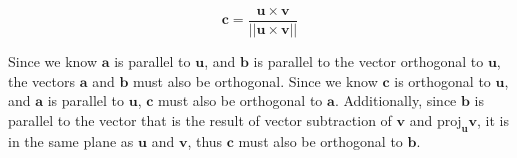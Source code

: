 \documentclass{article}
\newcommand{\mbf}[1]{\mathbf{#1}}
\newcommand{\magn}[1]{||\mbf{#1}||}
\begin{document}
\[
 \mbf{c} = \frac{\mbf{u} \times \mbf{v}}{\magn{\mbf{u} \times \mbf{v}}}
\]

Since we know \(\mbf{a}\) is parallel to \(\mbf{u}\), and \(\mbf{b}\) is parallel to the vector orthogonal to \(\mbf{u}\), the vectors \(\mbf{a}\) and \(\mbf{b}\) must also be orthogonal. Since we know \(\mbf{c}\) is orthogonal to \(\mbf{u}\), and \(\mbf{a}\) is parallel to \(\mbf{u}\), \(\mbf{c}\) must also be orthogonal to \(\mbf{a}\). Additionally, since \(\mbf{b}\) is parallel to the vector that is the result of vector subtraction of \(\mbf{v}\) and \(\text{proj}_{\mbf{u}} \mbf{v}\), it is in the same plane as \(\mbf{u}\) and \(\mbf{v}\), thus \(\mbf{c}\) must also be orthogonal to \(\mbf{b}\).
\end{document}

